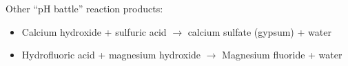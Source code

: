 \vskip 10pt

Other ``pH battle'' reaction products:

\begin{itemize}
\item{} Calcium hydroxide + sulfuric acid $\to$ calcium sulfate (gypsum) + water
\vskip 5pt
\item{} Hydrofluoric acid + magnesium hydroxide $\to$ Magnesium fluoride + water
\end{itemize}





